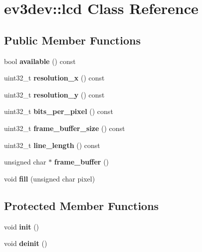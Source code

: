 \hypertarget{classev3dev_1_1lcd}{}\section{ev3dev\+:\+:lcd Class Reference}
\label{classev3dev_1_1lcd}
\subsection*{Public Member Functions}
\begin{DoxyCompactItemize}
\item 
\mbox{\label{classev3dev_1_1lcd_a82ad709de8c8b32228b1e60ecf046af6}} 
bool {\bfseries available} () const
\item 
\mbox{\label{classev3dev_1_1lcd_abcdd97ac0fc9295cece72722e858a193}} 
uint32\+\_\+t {\bfseries resolution\+\_\+x} () const
\item 
\mbox{\label{classev3dev_1_1lcd_a401698223422d86d61a626dc4a89fa34}} 
uint32\+\_\+t {\bfseries resolution\+\_\+y} () const
\item 
\mbox{\label{classev3dev_1_1lcd_a69ac194c0ecac4991f4636ef3e207562}} 
uint32\+\_\+t {\bfseries bits\+\_\+per\+\_\+pixel} () const
\item 
\mbox{\label{classev3dev_1_1lcd_aef474cffd1adde359cfd592983dfa27e}} 
uint32\+\_\+t {\bfseries frame\+\_\+buffer\+\_\+size} () const
\item 
\mbox{\label{classev3dev_1_1lcd_a05fa4f4dfd97bc6245410610f1aafc3f}} 
uint32\+\_\+t {\bfseries line\+\_\+length} () const
\item 
\mbox{\label{classev3dev_1_1lcd_adac133010e88c4aa1c008937ab075df3}} 
unsigned char $\ast$ {\bfseries frame\+\_\+buffer} ()
\item 
\mbox{\label{classev3dev_1_1lcd_a8e1a97375386b0116e544a38518232d0}} 
void {\bfseries fill} (unsigned char pixel)
\end{DoxyCompactItemize}
\subsection*{Protected Member Functions}
\begin{DoxyCompactItemize}
\item 
\mbox{\label{classev3dev_1_1lcd_adf3e12fbb70c70f52698823a95b97aeb}} 
void {\bfseries init} ()
\item 
\mbox{\label{classev3dev_1_1lcd_a08258725c0c59b3f2f92ba3ee3c9bf3a}} 
void {\bfseries deinit} ()
\end{DoxyCompactItemize}


